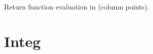\documentclass[a4paper,11pt,english]{sphinxmanual}
\begin{document}
\begin{fulllineitems}
\begin{fulllineitems}
\end{fulllineitems}


\begin{fulllineitems}
\label{\detokenize{python/cmdref_GlobalFunction:getfem.GlobalFunction.val}}
Return  function evaluation in  (column points).

\end{fulllineitems}


\end{fulllineitems}



\section{Integ}
\label{\detokenize{python/cmdref_Integ:integ}}\label{\detokenize{python/cmdref_Integ::doc}}
\end{document}
